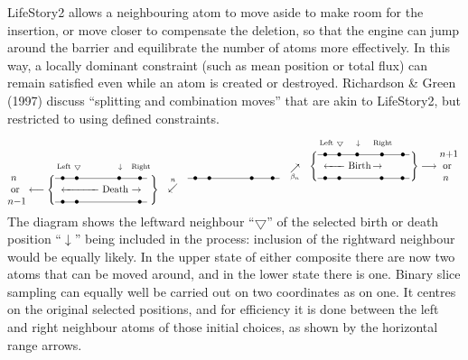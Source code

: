 LifeStory2 allows a neighbouring atom to move aside to make room for the insertion, or move closer to compensate the deletion,
so that the engine can jump around the barrier and equilibrate the number of atoms more effectively.
In this way, a locally dominant constraint (such as mean position or total flux) can remain satisfied even while an atom is created or destroyed.
Richardson \& Green (1997) discuss ``splitting and combination moves'' that are akin to LifeStory2, but restricted to using defined constraints.

$$
\lower 12pt\vbox{ \hbox{\ $n$}
                  \hbox{\ or}
                  \hbox{$n-$1}
                }
\longleftarrow
\Bigg\{
\lower 12pt\vbox{\hbox{\hskip 2pt {$\scriptstyle\rm Left$} $\scriptstyle\bigtriangledown$ \hskip 34.7pt $\scriptstyle\downarrow$ \hskip 6pt {$\scriptstyle\rm Right$}}
                 \LINEfour
                 \hbox{\hskip 6pt \hbox to 39pt{\leftarrowfill} Death $\rightarrow$}
                 \LINEthree
                }
\Bigg\}
\hskip 10pt \raise 2pt \DeathArrow \hskip 10pt
\raise 12pt\LINEfour
\hskip 10pt \raise 14pt\BirthArrow \hskip 10pt
\raise 24pt \hbox{$
                   \Bigg\{
                   \lower 12pt\vbox{\hbox{\hskip 2pt {$\scriptstyle\rm Left$} $\scriptstyle\bigtriangledown$
                                                                              \hskip 9.5pt $\scriptstyle\downarrow$ \hskip 10pt {$\scriptstyle\rm Right$}}
                                    \LINEfive
                                    \hbox{\hskip 6pt \hbox to 22pt{\leftarrowfill} Birth$\,\rightarrow$}
                                    \LINEfour
                                   }
                   \Bigg\}
                   \longrightarrow
                   \hbox{\lower 12pt \vbox{ \hbox{$n$+1}
                                            \hbox{\ or}
                                            \hbox{\ $n$}}
                                          }
                 $}
$$
The diagram shows the leftward neighbour ``$\bigtriangledown$'' of the selected birth or death position ``$\downarrow$'' being included in the process:
inclusion of the rightward neighbour would be equally likely.
In the upper state of either composite there are now two atoms that can be moved around, and in the lower state there is one.
Binary slice sampling can equally well be carried out on two coordinates as on one.
It centres on the original selected positions,
and for efficiency it is done between the left and right neighbour atoms of those initial choices, as shown by the horizontal range arrows.
